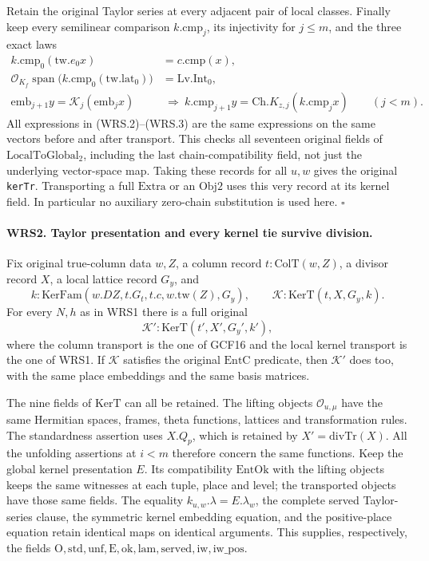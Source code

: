 \documentclass[11pt,a4paper]{article}
\numberwithin{equation}{section}
\theoremstyle{remark}\newtheorem{remark}[theorem]{Remark}
\begin{document}
Retain the original Taylor series at every adjacent pair of local
classes.  Finally keep every semilinear comparison \(k.\mathrm{cmp}_j\),
its injectivity for \(j\le m\), and the three exact laws
\[
 \begin{aligned}
 k.\mathrm{cmp}_0(\mathrm{tw}.e_0 x)&=c.\mathrm{cmp}(x),\\
 \mathcal O_{K_f}\operatorname{span}
   \bigl(k.\mathrm{cmp}_0(\mathrm{tw}.\mathrm{lat}_0)\bigr)
     &=\mathrm{Lv.Int}_0,\\
 \mathrm{emb}_{j+1}y=\mathcal K_j(\mathrm{emb}_j x)
   &\ \Longrightarrow\
 k.\mathrm{cmp}_{j+1}y=\mathrm{Ch}.K_{z,j}(k.\mathrm{cmp}_j x)
       \qquad(j<m).
 \end{aligned}                                                    \tag{WRS.3}
\]
All expressions in (WRS.2)--(WRS.3) are the same expressions on the
same vectors before and after transport.  This checks all seventeen
original fields of \(\mathrm{LocalToGlobal}_2\), including the last
chain-compatibility field, not just the underlying vector-space map.
Taking these records for all \(u,w\) gives the original
\texttt{ker\allowbreak Tr}.  Transporting a full \(\mathrm{Extra}\) or an
\(\mathrm{Obj2}\) uses this very record at its kernel field.
In particular no auxiliary zero-chain substitution is used here.
\hfill\(\square\)

\paragraph{WRS2. Taylor presentation and every kernel tie survive division.}
\label{claim:WRS2}
Fix original true-column data \(w,Z\), a column record
\(t:\mathrm{ColT}(w,Z)\), a divisor record \(X\), a local lattice
record \(G_y\), and
\[
 k:\mathrm{KerFam}(w.DZ,t.G_t,t.c,w.\mathrm{tw}(Z),G_y),\qquad
 \mathcal K:\mathrm{KerT}(t,X,G_y,k).
\]
For every \(N,h\) as in WRS1 there is a full original
\[
 \mathcal K':\mathrm{KerT}
       (t',X',G_y',k'),                              \tag{WRS.4}
\]
where the column transport is the one of GCF16 and the local kernel
transport is the one of WRS1.  If \(\mathcal K\) satisfies the
original \(\mathrm{EntC}\) predicate, then \(\mathcal K'\) does too,
with the same place embeddings and the same basis matrices.

The nine fields of \(\mathrm{KerT}\) can all be retained.  The
lifting objects \(\mathcal O_{u,\mu}\) have the same Hermitian
spaces, frames, theta functions, lattices and transformation rules.
The standardness assertion uses \(X.Q_p\), which is retained by
\(X'=\mathrm{divTr}(X)\).  All the unfolding assertions at
\(i<m\) therefore concern the same functions.  Keep the global
kernel presentation \(E\).  Its compatibility \(\mathrm{EntOk}\)
with the lifting objects keeps the same witnesses at each tuple,
place and level; the transported objects have those same fields.
The equality \(k_{u,w}.\lambda=E.\lambda_w\), the complete served
Taylor-series clause, the symmetric kernel embedding equation, and
the positive-place equation retain identical maps on identical
arguments.  This supplies, respectively, the fields
\(\mathrm{O},\mathrm{std},\mathrm{unf},\mathrm{E},\mathrm{ok},
\mathrm{lam},\mathrm{served},\mathrm{iw},\mathrm{iw\_\allowbreak pos}\).
\end{document}
